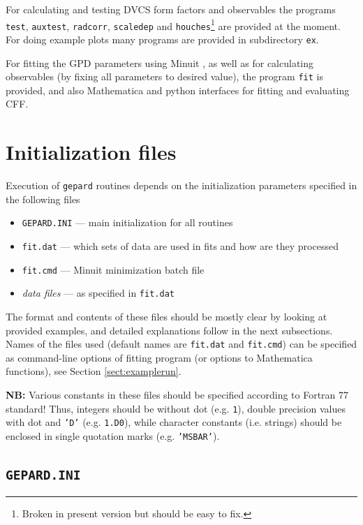 \documentclass[12pt]{article}
\begin{document}
For calculating and testing DVCS form factors and observables the programs \texttt{test},
\texttt{auxtest}, \texttt{radcorr}, \texttt{scaledep} and \texttt{houches}\footnote{Broken
in present version but should be easy to fix.} are provided at the
moment.
For doing example plots many programs are provided in subdirectory \texttt{ex}.

For fitting the GPD parameters using Minuit \cite{James:1975dr}, 
as well as for calculating observables (by
fixing all parameters to desired value), the program \texttt{fit} is provided, and
also Mathematica and python interfaces for fitting and evaluating CFF.

\section{Initialization files}
\label{sec:init}

Execution of \texttt{gepard} routines depends on the initialization parameters specified in
the following files
\begin{itemize}
\item  \texttt{GEPARD.INI} --- main initialization for all routines
\item  \texttt{fit.dat} --- which sets of data are used in fits and how are they processed
\item \texttt{fit.cmd} --- Minuit minimization batch file
\item \emph{data files} --- as specified in \texttt{fit.dat}
\end{itemize}
The format and contents of these files should be mostly clear by looking at provided
examples, and detailed explanations follow in the next subsections. Names of the
files used (default names are \texttt{fit.dat} and \texttt{fit.cmd}) can be specified
as command-line options of fitting program (or options to Mathematica functions), 
see Section \ref{sect:examplerun}.

\textbf{NB:} Various constants in these files should be specified
according to Fortran 77 standard! Thus, integers should be without dot (e.g.
\texttt{1}), double precision values with dot and \texttt{'D'} (e.g.
\texttt{1.D0}), while character constants (i.e. strings) should be enclosed in
single quotation marks (e.g. \texttt{'MSBAR'}).

\subsection{\texttt{GEPARD.INI}}
\label{ssect:GEPARD.INI}
\end{document}
